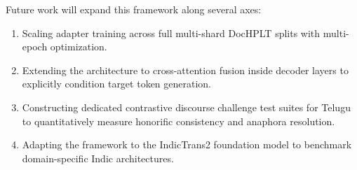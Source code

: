 \documentclass[conference]{IEEEtran}
\begin{document}
Future work will expand this framework along several axes:
\begin{enumerate}
    \item Scaling adapter training across full multi-shard DocHPLT splits with multi-epoch optimization.
    \item Extending the architecture to cross-attention fusion inside decoder layers to explicitly condition target token generation.
    \item Constructing dedicated contrastive discourse challenge test suites for Telugu to quantitatively measure honorific consistency and anaphora resolution.
    \item Adapting the framework to the IndicTrans2 foundation model to benchmark domain-specific Indic architectures.
\end{enumerate}




\end{document}
